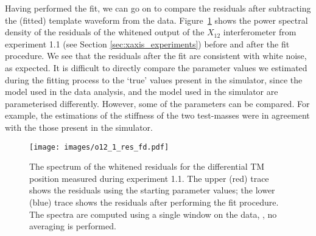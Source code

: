 Having performed the fit, we can go on to compare the residuals after subtracting
the (fitted) template waveform from the data. Figure~\ref{fig:o12_1_res_fd} shows
the power spectral density of the residuals of the whitened output of the $X_{12}$
interferometer from experiment 1.1 (see Section \ref{sec:xaxis_experiments})
before and after the fit procedure. We see that the residuals after the fit are
consistent with white noise, as expected. It is difficult to directly compare
the parameter values we estimated during the fitting process to the `true' values
present in the simulator, since the model used in the data analysis, and the model
used in the simulator are parameterised differently. However, some of the parameters
can be compared. For example, the estimations of the stiffness of the
two test-masses were in agreement with the those present in the simulator.


\begin{figure}[htbp] 
	\centering
	\texttt{[image: images/o12\_1\_res\_fd.pdf]}

\caption{The spectrum of the whitened residuals for the differential TM position measured 
during experiment 1.1. The upper (red) trace shows the residuals using the starting
parameter values; the lower (blue) trace shows the residuals after performing
the fit procedure. The spectra are computed using a single window on the data,
\ie, no averaging is performed.}

	\label{fig:o12_1_res_fd}
\end{figure}




